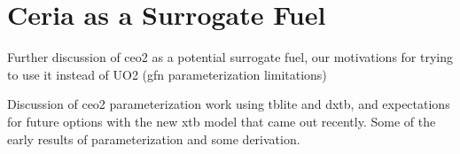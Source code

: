 \singlespacing
\chapter{Ceria as a Surrogate Fuel}\label{apx:B}

Further discussion of ceo2 as a potential surrogate fuel, our motivations for trying to use it instead of UO2 (gfn parameterization limitations)

Discussion of ceo2 parameterization work using tblite and dxtb, and expectations for future options with the new xtb model that came out recently. Some of the early results of parameterization and some derivation.


\clearpage